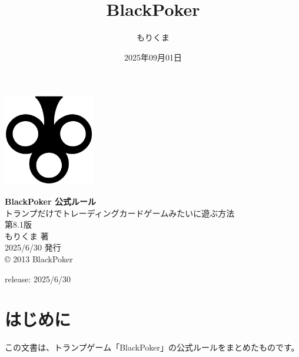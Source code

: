 \documentclass[letterpaper,10pt,dvipdfmx]{sphinxmanual}
\title{BlackPoker}
\date{2025年09月01日}
\author{もりくま}
\begin{document}
\pagestyle{empty}

\begin{titlepage}
\begin{center}
\vspace*{25mm}

\includegraphics[width=4cm]{blackpoker_logo.pdf}  %

\vspace{20mm}
{\Huge \textbf{BlackPoker 公式ルール}}\\[10mm]
{\Large トランプだけでトレーディングカードゲームみたいに遊ぶ方法}\\[30mm]

{\huge 第8.1版}\\[20mm]

{\Large もりくま 著} \\[5mm]
{\Large 2025/6/30 発行}\\[10mm]

{\small © 2013 BlackPoker}

\end{center}
\end{titlepage}

\clearpage
\thispagestyle{empty}  %
\null                  %
\clearpage             %

\pagestyle{plain}
\sphinxtableofcontents
\pagestyle{normal}
\label{\detokenize{index::doc}}


\sphinxAtStartPar
release: 2025/6/30

\sphinxstepscope


\chapter{はじめに}
\label{\detokenize{init/init:init-rst}}\label{\detokenize{init/init:id1}}\label{\detokenize{init/init::doc}}
\sphinxAtStartPar
この文書は、トランプゲーム「BlackPoker」の公式ルールをまとめたものです。
\end{document}
